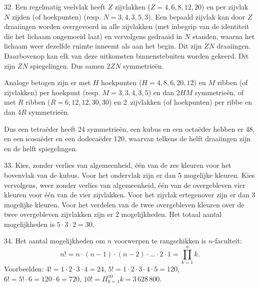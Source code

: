 \begin{problem}{32.}
	Een regelmatig veelvlak heeft $Z$ zijvlakken ($Z = 4,6,8,12,20$) en per zijvlak $N$ zijden (of hoekpunten) (resp. $N = 3,4,3,5,3$). Een bepaald zijvlak kan door $Z$ draaiingen worden overgevoerd in alle zijvlakken (met inbegrip van de identiteit die het lichaam ongemoeid laat) en vervolgens gedraaid in $N$ standen, waarna het lichaam weer dezelfde ruimte inneemt als aan het begin. Dit zijn $Z N$ draaiingen. Daarbovenop kan elk van deze uitkomsten binnenstebuiten worden gekeerd. Dit zijn $Z N$ spiegelingen. Dus samen $2 Z N$ symmetrieën.

    Analoge betogen zijn er met $H$ hoekpunten ($H = 4,8,6,20,12$) en $M$ ribben (of zijvlakken) per hoekpunt (resp. $M = 3,3,4,3,5$) en dan $2 H M$ symmetrieën, of met $R$ ribben ($R = 6,12,12,30,30$) en 2~zijvlakken (of hoekpunten) per ribbe en dan $4 R$ symmetrieën.

    Dus een tetraëder heeft 24 symmetrieën, een kubus en een octaëder hebben er 48, en een icosaëder en een dodecaëder 120, waarvan telkens de helft draaiingen zijn en de helft spiegelingen.
\end{problem}

\clearpage

\begin{problem}{33.}
    Kies, zonder verlies van algemeenheid, één van de zes kleuren voor het bovenvlak van de kubus. Voor het ondervlak zijn er dan 5 mogelijke kleuren. Kies vervolgens, weer zonder verlies van algemeen\-heid, één van de overgebleven vier kleuren voor één van de vier zij\-vlakken. Voor het zijvlak ertegenover zijn er dan 3 mogelijke kleuren. Voor het verdelen van de twee overgebleven kleuren over de twee overgebleven zijvlakken zijn er 2 mogelijkheden. Het totaal aantal mogelijkheden is $5 \cdot 3 \cdot 2 = 30$.
\end{problem}

\begin{problem}{34.}
    Het aantal mogelijkheden om $n$ voorwerpen te rangschikken is $n$-faculteit:
    \begin{equation*}
        n! = n \cdot (n - 1) \cdot (n - 2) \cdot \dots \cdot 2 \cdot 1 = \textstyle\prod\limits_{k=1}^{n} k.
    \end{equation*}
    Voorbeelden: $4! = 1 \cdot 2 \cdot 3 \cdot 4 = 24$, $5! = 1 \cdot 2 \cdot 3 \cdot 4 \cdot 5 = 120$, $6! = 5! \cdot 6 = 120 \cdot 6 = 720$, $10! = \Pi_{k=1}^{10} k = 3\,628\,800$.
\end{problem}

